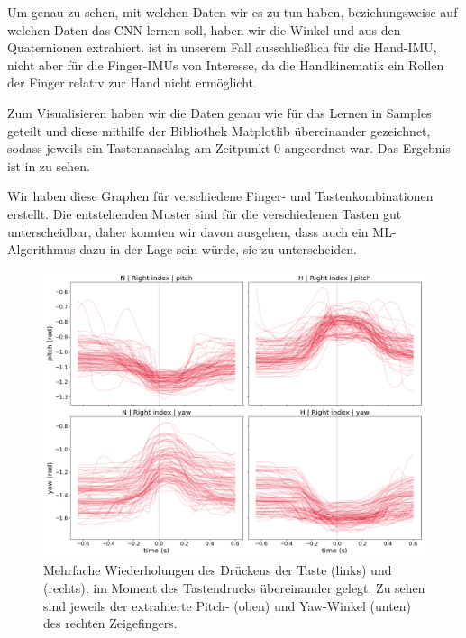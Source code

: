 Um genau zu sehen, mit welchen Daten wir es zu tun haben, beziehungsweise auf welchen Daten das CNN lernen soll, haben wir die Winkel  und  aus den Quaternionen extrahiert.
{} ist in unserem Fall ausschließlich für die Hand-IMU, nicht aber für die Finger-IMUs von Interesse, da die Handkinematik ein Rollen der Finger relativ zur Hand nicht ermöglicht.


Zum Visualisieren haben wir die Daten genau wie für das Lernen in Samples geteilt und diese mithilfe der Bibliothek Matplotlib \citep{matplotlib} übereinander gezeichnet, sodass jeweils ein Tastenanschlag am Zeitpunkt 0 angeordnet war. Das Ergebnis ist in  zu sehen.

Wir haben diese Graphen für verschiedene Finger- und Tastenkombinationen erstellt. Die entstehenden Muster sind für die verschiedenen Tasten gut unterscheidbar, daher konnten wir davon ausgehen, dass auch ein ML-Algorithmus dazu in der Lage sein würde, sie zu unterscheiden.

\begin{figure}
    \includegraphics[width=\textwidth]{../common/images/plot-samples-2x2.png}
    \caption[Mehrfache Wiederholungen eines Tastendrucks]{Mehrfache Wiederholungen des Drückens der Taste  (links) und  (rechts), im Moment des Tastendrucks übereinander gelegt. Zu sehen sind jeweils der extrahierte Pitch- (oben) und Yaw-Winkel (unten) des rechten Zeigefingers.}
\end{figure}


